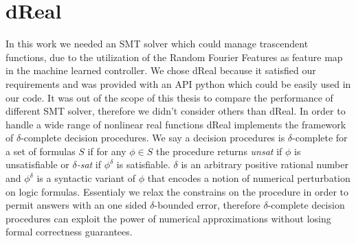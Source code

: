 \section{dReal}\label{sec:dReal}
In this work we needed an SMT solver which could manage trascendent functions, due to the utilization of the Random Fourier Features as feature map in the machine learned controller. We chose dReal \cite{gao2013dreal} because it satisfied our requirements and was provided with an API python which could be easily used in our code. It was out of the scope of this thesis to compare the performance of different SMT solver, therefore we didn't consider others than dReal.
In order to handle a wide range of nonlinear real functions dReal implements the framework of $\delta$-complete decision procedures. We say a decision procedures is $\delta$-complete for a set of formulas $S$ if for any $\phi \in S$ the procedure returns \textit{unsat} if $\phi$ is unsatisfiable or \textit{$\delta$-sat} if $\phi^\delta$ is satisfiable.
$\delta$ is an arbitrary positive rational number and $\phi^\delta$ is a syntactic variant of $\phi$ that encodes a notion of numerical perturbation on logic formulas. Essentialy we relax the constrains on the procedure in order to permit answers with an one sided $\delta$-bounded error, therefore $\delta$-complete decision procedures can exploit the power of numerical approximations without losing formal correctness guarantees.